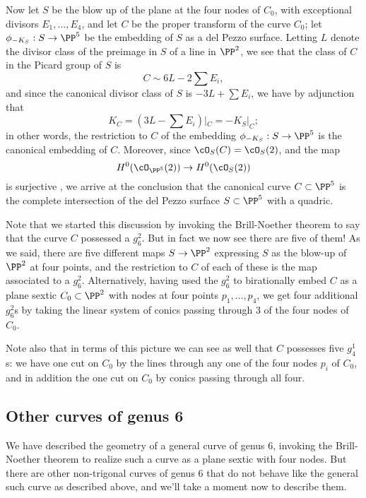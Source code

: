 Now let $S$ be the blow up of the plane at the four nodes of $C_0$, with exceptional divisors $E_1, \dots, E_4$, and let $C$ be the proper transform of the curve $C_0$; let $\phi_{-K_S} : S \to \PP^5$ be the embedding of $S$ as a del Pezzo surface. Letting $L$ denote the divisor class of the preimage in $S$ of a line in $\PP^2$, we see that the class of $C$ in the Picard group of $S$ is
$$
C \sim 6L - 2\sum E_i,
$$ 
and since the canonical divisor class of $S$ is $-3L + \sum E_i$, we have by adjunction that
$$
K_C = (3L - \sum E_i)|_C = -K_S|_C;
$$ 
in other words, the restriction to $C$ of the embedding $\phi_{-K_S} : S \to \PP^5$ is the canonical embedding of $C$. Moreover, since $\cO_S(C) = \cO_S(2)$, and the map 
$$
H^0(\cO_{\PP^5}(2)) \to H^0(\cO_S(2))
$$
is surjective , we arrive at the conclusion that the canonical curve $C \subset \PP^5$ is the complete intersection of the del Pezzo surface $S \subset \PP^5$ with a quadric.

Note that we started this discussion by invoking the Brill-Noether theorem to say that the curve $C$ possessed a $g^2_6$. But in fact we now see there are five of them! As we said, there are five different maps $S \to \PP^2$ expressing $S$ as the blow-up of $\PP^2$ at four points, and the restriction to $C$ of each of these is the map associated to a $g^2_6$. Alternatively, having used the $g^2_6$ to birationally embed $C$ as a plane sextic $C_0 \subset \PP^2$ with nodes at four points $p_1,\dots,p_4$, we get four additional $g^2_6$s by taking the linear system of conics passing through 3 of the four nodes of $C_0$.

Note also that in terms of this picture we can see as well that $C$ possesses five $g^1_4$s: we have one cut on $C_0$ by the lines through any one of the four nodes $p_i$ of $C_0$, and in addition the one cut on $C_0$ by conics passing through all four.

\subsection{Other curves of genus 6}

We have described the geometry of a general curve of genus 6, invoking the Brill-Noether theorem to realize such a curve as a plane sextic with four nodes. But there are other non-trigonal curves of genus 6 that do not behave like the general such curve as described above, and we'll take a moment now to describe them.

